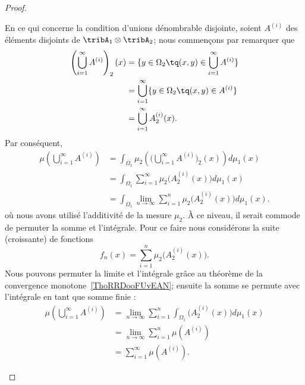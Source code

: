 \begin{proof}
\begin{subproof}
    En ce qui concerne la condition d'unions dénombrable disjointe, soient \( A^{(i)}\) des éléments disjoints de \( \tribA_1\otimes \tribA_2\); nous commençons par remarquer que
    \begin{subequations}
        \begin{align}
            \left( \bigcup_{i=1}^{\infty}A^{(i)} \right)_2(x)&=\{ y\in\Omega_2\tq (x,y)\in\bigcup_{i=1}^{\infty}A^{(i)} \}\\
            &=\bigcup_{i=1}^{\infty}\{ y\in\Omega_2\tq (x,y)\in A^{(i)} \}\\
            &=\bigcup_{i=1}^{\infty}A^{(i)}_2(x).
        \end{align}
    \end{subequations}
    Par conséquent,
    \begin{subequations}
        \begin{align}
            \mu\left( \bigcup_{i=1}^{\infty}A^{(i)} \right)&=\int_{\Omega_1}\mu_2\left(    \Big( \bigcup_{i=1}^{\infty}A^{(i)} \Big)_2(x)     \right)d\mu_1(x)\\
            &=\int_{\Omega_1}\sum_{i=1}^{\infty}\mu_2\big( A^{(i)}_2(x) \big)d\mu_1(x)\\
            &=\int_{\Omega_1}\lim_{n\to \infty} \sum_{i=1}^{n}\mu_2\big( A^{(i)}_2(x) \big)d\mu_1(x).
        \end{align}
    \end{subequations}
    où nous avons utilisé l'additivité de la mesure \( \mu_2\). À ce niveau, il serait commode de permuter la somme et l'intégrale. Pour ce faire nous considérons la suite (croissante) de fonctions
    \begin{equation}
        f_n(x)=\sum_{i=1}^n\mu_2\big( A_2^{(i)}(x) \big).
    \end{equation}
    Nous pouvons permuter la limite et l'intégrale grâce au théorème de la convergence monotone~\ref{ThoRRDooFUvEAN}; ensuite la somme se permute avec l'intégrale en tant que somme finie :
    \begin{subequations}
        \begin{align}
            \mu\left( \bigcup_{i=1}^{\infty}A^{(i)} \right)&=\lim_{n\to \infty} \sum_{i=1}^n\int_{\Omega_1}\big( A_2^{(i)}(x) \big)d\mu_1(x)\\
            &=\lim_{n\to \infty} \sum_{i=1}^n\mu(A^{(i)})\\
            &=\sum_{i=1}^{\infty}\mu( A^{(i)} ).
        \end{align}
    \end{subequations}


\end{subproof}
\end{proof}

